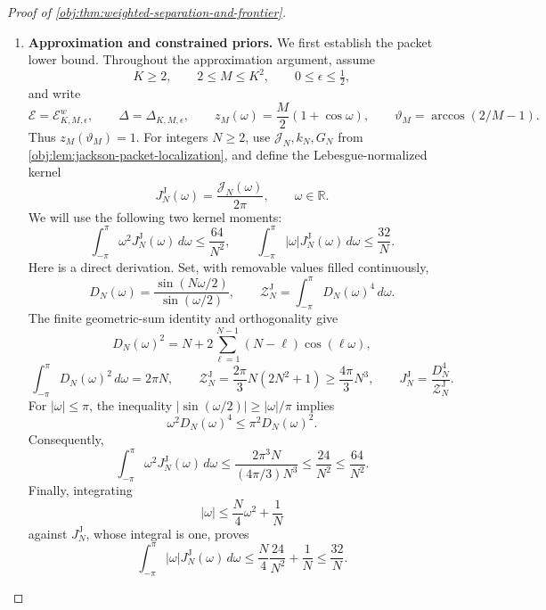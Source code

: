 \documentclass[11pt]{article}
\begin{document}
\begin{proof}[Proof of \cref{obj:thm:weighted-separation-and-frontier}]
\begin{enumerate}
\item
\textbf{Approximation and constrained priors.}\quad
We first establish the packet lower bound. Throughout the approximation argument, assume
\[
K\ge2,\qquad 2\le M\le K^2,\qquad 0\le\epsilon\le\tfrac12,
\]
and write
\[
\mathcal E=\mathcal E_{K,M,\epsilon}^{w},
\qquad
\Delta=\Delta_{K,M,\epsilon},
\qquad
z_M(\omega)=\frac M2(1+\cos\omega),
\qquad
\vartheta_M=\arccos(2/M-1).
\]
Thus \(z_M(\vartheta_M)=1\). For integers \(N\ge2\), use
\(\mathcal J_N,k_N,G_N\) from
\cref{obj:lem:jackson-packet-localization}, and define the Lebesgue-normalized kernel
\[
J_N^{\mathrm J}(\omega)=\frac{\mathcal J_N(\omega)}{2\pi},
\qquad \omega\in\mathbb R.
\]
We will use the following two kernel moments:
\[
\int_{-\pi}^{\pi}\omega^2J_N^{\mathrm J}(\omega)\,d\omega
\le\frac{64}{N^2},
\qquad
\int_{-\pi}^{\pi}|\omega|J_N^{\mathrm J}(\omega)\,d\omega
\le\frac{32}{N}.
\]
Here is a direct derivation. Set, with removable values filled continuously,
\[
D_N(\omega)=\frac{\sin(N\omega/2)}{\sin(\omega/2)},
\qquad
\mathcal Z_N^{\mathrm J}
=\int_{-\pi}^{\pi}D_N(\omega)^4\,d\omega.
\]
The finite geometric-sum identity and orthogonality give
\[
D_N(\omega)^2
=N+2\sum_{\ell=1}^{N-1}(N-\ell)\cos(\ell\omega),
\]
\[
\int_{-\pi}^{\pi}D_N(\omega)^2\,d\omega=2\pi N,
\qquad
\mathcal Z_N^{\mathrm J}
=\frac{2\pi}{3}N(2N^2+1)
\ge\frac{4\pi}{3}N^3,
\qquad
J_N^{\mathrm J}=\frac{D_N^4}{\mathcal Z_N^{\mathrm J}}.
\]
For \(|\omega|\le\pi\), the inequality
\(|\sin(\omega/2)|\ge|\omega|/\pi\) implies
\[
\omega^2D_N(\omega)^4\le\pi^2D_N(\omega)^2.
\]
Consequently,
\[
\int_{-\pi}^{\pi}\omega^2J_N^{\mathrm J}(\omega)\,d\omega
\le
\frac{2\pi^3N}{(4\pi/3)N^3}
\le\frac{24}{N^2}
\le\frac{64}{N^2}.
\]
Finally, integrating
\[
|\omega|\le\frac N4\omega^2+\frac1N
\]
against \(J_N^{\mathrm J}\), whose integral is one, proves
\[
\int_{-\pi}^{\pi}|\omega|J_N^{\mathrm J}(\omega)\,d\omega
\le\frac N4\frac{24}{N^2}+\frac1N
\le\frac{32}{N}.
\]


\end{enumerate}
\end{proof}
\end{document}
